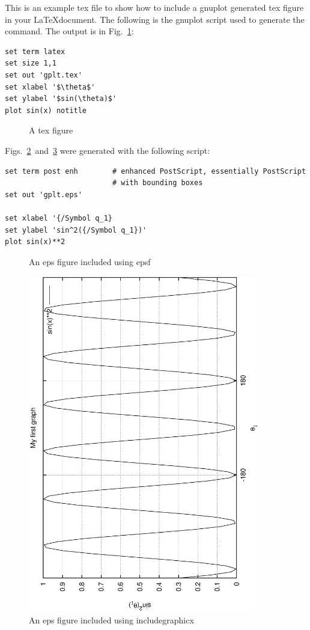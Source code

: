 \documentclass{article}
\begin{document}
This is an example tex file to show how to include a gnuplot generated
tex figure in your \LaTeX document. The following is the gnuplot
script used to generate the command. The output is in Fig.~\ref{fig1}:

\begin{verbatim}
set term latex
set size 1,1
set out 'gplt.tex'
set xlabel '$\theta$'
set ylabel '$sin(\theta)$'
plot sin(x) notitle
\end{verbatim}

\begin{figure}

\caption{A tex figure}
\label{fig1}
\end{figure}

Figs.~\ref{fig2}~and~\ref{fig3} were generated with the following
script:
\begin{verbatim}
set term post enh  		 # enhanced PostScript, essentially PostScript 
		 		 		 # with bounding boxes
set out 'gplt.eps'

set xlabel '{/Symbol q_1}
set ylabel 'sin^2({/Symbol q_1})'
plot sin(x)**2
\end{verbatim}
\begin{figure}
\textwidth
{}
\caption{An eps figure included using epsf}
\label{fig2}
\end{figure}

\begin{figure} 
 \centering 
 \includegraphics[width=0.9\textwidth]{gplt.eps}
\caption{An eps figure included using includegraphicx}  
\label{fig3}
\end{figure}
\end{document}
